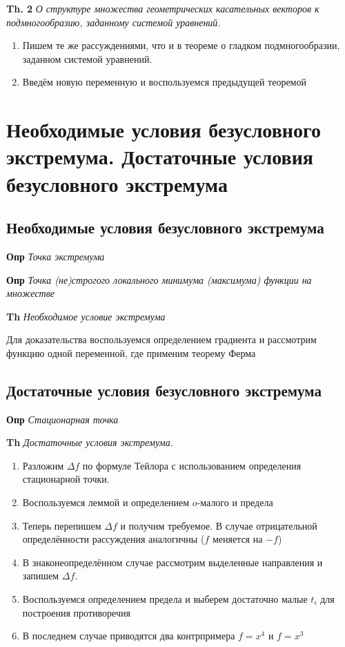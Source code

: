 \documentclass[a4paper, 14pt]{article}
\begin{document}
    \textbf{Th. 2} \textit{О структуре множества геометрических касательных векторов к подмногообразию, заданному
    системой уравнений.}
    
    \begin{enumerate}
        \item Пишем те же рассуждениями, что и в теореме о гладком подмногообразии, заданном системой уравнений.
        \item Введём новую переменную и воспользуемся предыдущей теоремой
    \end{enumerate}
    
    \section{Необходимые условия безусловного экстремума.
    Достаточные условия безусловного экстремума}
    
    \subsection{Необходимые условия безусловного экстремума}
    
    \textbf{Опр} \textit{Точка экстремума}
    
    \textbf{Опр} \textit{Точка (не)строгого локального минимума (максимума) функции на множестве}
    
    \textbf{Th} \textit{Необходимое условие экстремума}
    
    Для доказательства воспользуемся определением градиента и рассмотрим функцию одной переменной, где применим теорему
    Ферма
    
    \subsection{Достаточные условия безусловного экстремума}
    
    \textbf{Опр} \textit{Стационарная точка}
    
    \textbf{Th} \textit{Достаточные условия экстремума.}
    
    \begin{enumerate}
        \item Разложим $\Delta f$ по формуле Тейлора с использованием определения стационарной точки.
        \item Воспользуемся леммой и определением $o$-малого и предела
        \item Теперь перепишем $\Delta f$ и получим требуемое.
        В случае отрицательной определённости рассуждения аналогичны ($f$ меняется на $-f$)
        \item В знаконеопределённом случае рассмотрим выделенные направления и запишем $\Delta f$.
        \item Воспользуемся определением предела и выберем достаточно малые $t_i$ для построения противоречия
        \item В последнем случае приводятся два контрпримера $f = x^4$ и $f = x^3$
    \end{enumerate}
    
\end{document}
